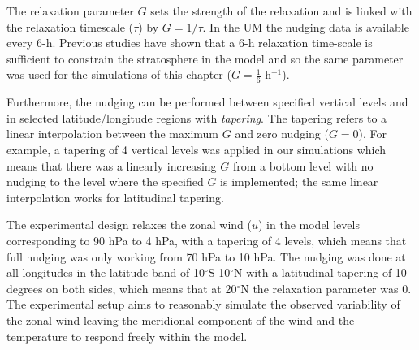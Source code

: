 The relaxation parameter $G$ sets the strength of the relaxation and is linked with the relaxation timescale ($\tau$) by $G=1/\tau$. In the UM the nudging data is available every 6-h. Previous studies \citep{telford2008description,gray2020} have shown that a 6-h relaxation time-scale is sufficient to constrain the stratosphere in the model and so the same parameter was used for the simulations of this chapter ($G=\frac{1}{6}$ h$^{-1}$).%

Furthermore, the nudging can be performed between specified vertical levels and in selected latitude/longitude regions with \textit{tapering}. The tapering refers to a linear interpolation between the maximum $G$ and zero nudging ($G=0$). 
For example, a tapering of 4 vertical levels was applied in our simulations which means that there was a linearly increasing $G$ from a bottom level with no nudging to the level where the specified $G$ is  implemented; the same linear interpolation works for latitudinal tapering.

The experimental design relaxes the zonal wind ($u$) in the model levels corresponding to 90 hPa to 4 hPa, with a tapering of 4 levels, which means that full nudging was only working from 70 hPa to 10 hPa. The nudging was done at all longitudes in the latitude band of 10$^\circ$S-10$^\circ$N with a latitudinal tapering of 10 degrees on both sides, which means that at 20$^\circ$N the relaxation parameter was 0.
The experimental setup aims to reasonably simulate the observed variability of the zonal wind leaving the meridional component of the wind and the temperature to respond freely within the model. %

